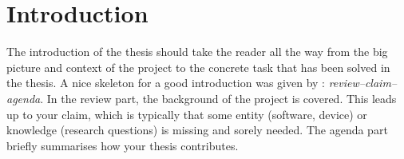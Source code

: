 \chapter{Introduction}
The introduction of the thesis should take the reader all the way from the big picture and context of the project to the concrete task that has been solved in the thesis. A nice skeleton for a good introduction was given by : \emph{review–claim–agenda}. In the review part, the background of the project is covered. This leads up to your claim, which is typically that some entity (software, device) or knowledge (research questions) is missing and sorely needed. The agenda part briefly summarises how your thesis contributes.